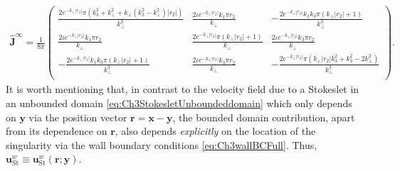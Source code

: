 \documentclass{jfm}
\begin{document}
\begin{align}
\hat{\bm{J}}^\infty=\frac{1}{8\pi}\left(
\begin{array}{ccc}
\frac{2 e^{-k_\perp \left| r_2\right| } \pi  \left(k_3^2+k_\perp^2+k_\perp \left(k_3^2-k_\perp^2\right) \left| r_2\right| \right)}{k_\perp^3} & \frac{2 \iota e^{-k_\perp \left| r_2\right| } k_1 \pi  r_2}{k_\perp} & -\frac{2 e^{-k_\perp \left| r_2\right| } k_1 k_3 \pi (k_\perp \left| r_2\right| +1)}{k_\perp^3} \\
\frac{2 \iota e^{-k_\perp \left| r_2\right| } k_1 \pi  r_2}{k_\perp} & \frac{2 e^{-k_\perp \left| r_2\right| } \pi  (k_\perp \left| r_2\right| +1)}{k_\perp} & \frac{2 \iota e^{-k_\perp \left| r_2\right| } k_3 \pi  r_2}{k_\perp} \\
-\frac{2 e^{-k_\perp \left| r_2\right| } k_1 k_3 \pi  (k_\perp \left| r_2\right| +1)}{k_\perp^3} & \frac{2 \iota e^{-k_\perp \left| r_2\right| } k_3 \pi r_2}{k_\perp} & -\frac{2 e^{-k_\perp \left| r_2\right| } \pi  \left(k_\perp \left| r_2\right|  k_3^2+k_3^2-2 k_\perp^2\right)}{k_\perp^3} \\
\end{array}
\right).
\label{eq:Ch3Jhatinfinity}
\end{align}
It is worth mentioning that, in contrast to the velocity field due to a Stokeslet in an unbounded domain \eqref{eq:Ch3StokesletUnboundeddomain} which only depends on $\bm{y}$ via the position vector $\bm{r}=\bm{x}-\bm{y}$, the bounded domain contribution, apart from its dependence on $\bm{r}$, also depends \textit{explicitly} on the location of the singularity via the wall boundary conditions \eqref{eq:Ch3wallBCFull}. Thus, $\bm{u}^{w}_\text{St} \equiv\bm{u}^{w}_\text{St}(\bm{r};\bm{y})$. 
\end{document}

